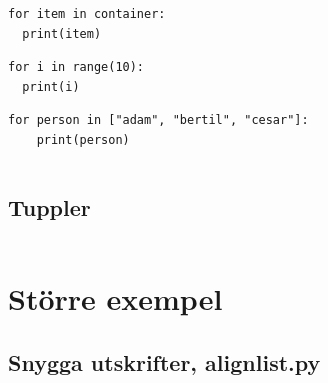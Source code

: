\begin{frame}[fragile]
  \begin{verbatim}
for item in container:
  print(item)
  \end{verbatim}
\end{frame}

\begin{frame}[fragile]
  \begin{example}
    \begin{verbatim}
for i in range(10):
  print(i)
    \end{verbatim}
  \end{example}
\end{frame}

\begin{frame}[fragile]
  \begin{example}
    \begin{verbatim}
for person in ["adam", "bertil", "cesar"]:
    print(person)
    \end{verbatim}
  \end{example}
\end{frame}

\begin{frame}[fragile]
  \begin{example}
    \inputminted[firstline=1,lastline=10]{python}{examples/phone-for.py}
  \end{example}
\end{frame}



\subsection{Tuppler}

\begin{frame}[fragile]
  \begin{example}[tuples.py]
    \inputminted{python}{examples/tuples.py}
  \end{example}
\end{frame}


\section{Större exempel}

\subsection{Snygga utskrifter, align\textunderscore{}list.py}


